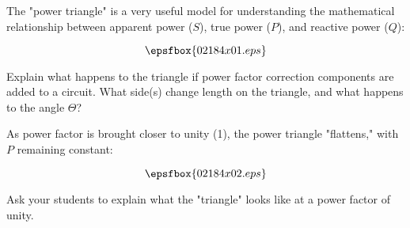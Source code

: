

The "power triangle" is a very useful model for understanding the mathematical relationship between apparent power ($S$), true power ($P$), and reactive power ($Q$):

$$\epsfbox{02184x01.eps}$$

Explain what happens to the triangle if power factor correction components are added to a circuit.  What side(s) change length on the triangle, and what happens to the angle $\Theta$?







As power factor is brought closer to unity (1), the power triangle "flattens," with $P$ remaining constant:

$$\epsfbox{02184x02.eps}$$







Ask your students to explain what the "triangle" looks like at a power factor of unity.




